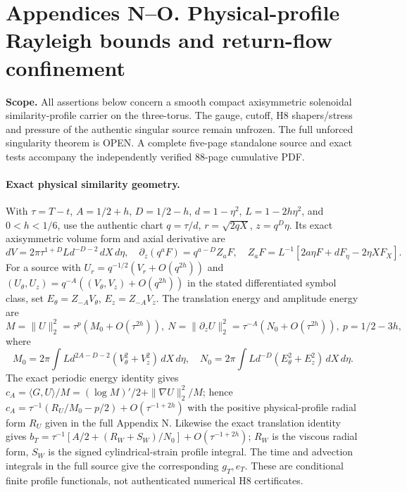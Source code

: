 \clearpage
\section*{Appendices N--O. Physical-profile Rayleigh bounds and return-flow confinement}
\noindent\textbf{Scope.} All assertions below concern a smooth compact axisymmetric solenoidal similarity-profile carrier on the three-torus. The gauge, cutoff, H8 shapers/stress and pressure of the authentic singular source remain unfrozen. The full unforced singularity theorem is OPEN. A complete five-page standalone source and exact tests accompany the independently verified 88-page cumulative PDF.

\paragraph{Exact physical similarity geometry.}
With $\tau=T-t$, $A=1/2+h$, $D=1/2-h$, $d=1-\eta^2$, $L=1-2h\eta^2$, and $0<h<1/6$, use the authentic chart $q=\tau/d$, $r=\sqrt{2qX}$, $z=q^D\eta$. Its exact axisymmetric volume form and axial derivative are
\[
dV=2\pi\tau^{1+D}Ld^{-D-2}\,dX\,d\eta,\quad
\partial_z(q^aF)=q^{a-D}Z_aF,\quad
Z_aF=L^{-1}[2a\eta F+dF_\eta-2\eta XF_X].
\]
For a source with $U_r=q^{-1/2}(V_r+O(q^{2h}))$ and
$(U_\theta,U_z)=q^{-A}((V_\theta,V_z)+O(q^{2h}))$ in the stated differentiated symbol class, set
$E_\theta=Z_{-A}V_\theta$, $E_z=Z_{-A}V_z$.
The translation energy and amplitude energy are
\[
M=\|U\|_2^2=\tau^p(M_0+O(\tau^{2h})),\
N=\|\partial_zU\|_2^2=\tau^{-A}(N_0+O(\tau^{2h})),\
p=1/2-3h,
\]
where
\[
M_0=2\pi\int Ld^{2A-D-2}(V_\theta^2+V_z^2)\,dX\,d\eta,\quad
N_0=2\pi\int Ld^{-D}(E_\theta^2+E_z^2)\,dX\,d\eta.
\]
The exact periodic energy identity gives
$c_A=\langle G,U\rangle/M=(\log M)'/2+\|\nabla U\|_2^2/M$;
hence $c_A=\tau^{-1}(R_U/M_0-p/2)+O(\tau^{-1+2h})$
with the positive physical-profile radial form $R_U$ given in the full Appendix N.
Likewise the exact translation identity gives
$b_T=\tau^{-1}[A/2+(R_W+S_W)/N_0]+O(\tau^{-1+2h})$;
$R_W$ is the viscous radial form, $S_W$ is the signed cylindrical-strain profile integral. The time and advection integrals in the full source give the corresponding $g_T,e_T$. These are conditional finite profile functionals, not authenticated numerical H8 certificates.

